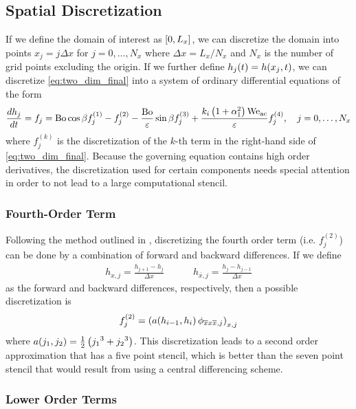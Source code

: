 \subsection{Spatial Discretization}
If we define the domain of interest as $\left[ 0, L_x \right]$, we can discretize the 
domain into points $x_j = j\Delta x$ for $j = 0, \ldots, N_x$ where 
$\Delta x = L_x / N_x$ and $N_x$ is the number of grid points excluding the origin. 
If we further define $h_j\!\left( t \right) = h\!\left( x_j, t \right)$, we can discretize 
\cref{eq:two_dim_final} into a system of ordinary differential equations of the form 
\begin{equation}
    \frac{d h_j}{d t} = f_j = \mathrm{Bo}\cos \beta f_j^{(1)} - f_j^{(2)} -  \frac{\mathrm{Bo}}{\varepsilon} \sin \beta f_j^{(3)} +  
    \frac{k_i \left( 1 + \alpha_1^2 \right) \mathrm{We_{ac}}}{\varepsilon} f_j^{(4)}, \quad j = 0, \ldots, N_x
    \label{eq:ode_sys}
\end{equation}
where $f_j^{(k)}$ is the discretization of the $k$-th term in
the right-hand side of \cref{eq:two_dim_final}. Because the governing equation 
contains high order derivatives, the discretization used for certain components 
needs special attention in order to not lead to a large computational stencil.

\subsubsection{Fourth-Order Term}
Following the method outlined in \cite{kondic2003instabilities}, discretizing the fourth order term (i.e.\! $f_j^{(2)}$) can be done by a combination
of forward and backward differences. If we define 
\begin{align*}
    h_{x, j} = \frac{h_{j+1} - h_j}{\Delta x} \quad \quad \quad h_{\overline{x}, j} = \frac{h_{j} - h_{j-1}}{\Delta x}
\end{align*}
as the forward and backward differences, respectively, then a possible discretization is 
\begin{equation}
    f_j^{\left( 2 \right)} = \left( a\!\left( h_{i-1}, h_i \right) \phi_{\overline{x}x\overline{x}, j} \right)_{x, j}
    \label{eq:f2_disc}
\end{equation}
where $a\!\left( j_1, j_2 \right) = \frac{1}{2} \left( {j_1}^3 + {j_2}^3 \right)$. This discretization leads to a 
second order approximation that has a five point stencil, which is better than the seven point stencil
that would result from using a central differencing scheme. 

\subsubsection{Lower Order Terms}
